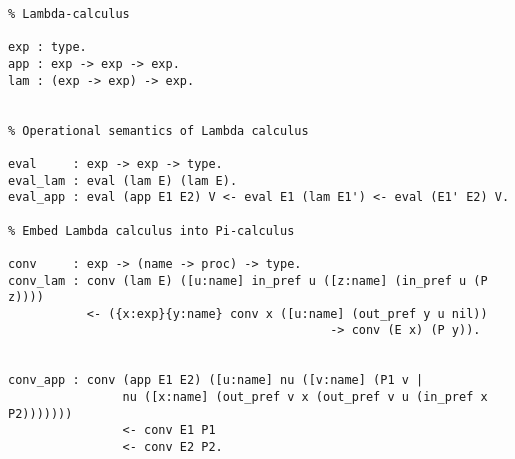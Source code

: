\begin{verbatim}
% Lambda-calculus

exp : type.
app : exp -> exp -> exp.
lam : (exp -> exp) -> exp.


% Operational semantics of Lambda calculus

eval     : exp -> exp -> type.
eval_lam : eval (lam E) (lam E).
eval_app : eval (app E1 E2) V <- eval E1 (lam E1') <- eval (E1' E2) V.

% Embed Lambda calculus into Pi-calculus

conv     : exp -> (name -> proc) -> type.
conv_lam : conv (lam E) ([u:name] in_pref u ([z:name] (in_pref u (P z))))
           <- ({x:exp}{y:name} conv x ([u:name] (out_pref y u nil))  
                                             -> conv (E x) (P y)).


conv_app : conv (app E1 E2) ([u:name] nu ([v:name] (P1 v | 
                nu ([x:name] (out_pref v x (out_pref v u (in_pref x P2)))))))
                <- conv E1 P1
                <- conv E2 P2.
\end{verbatim}
